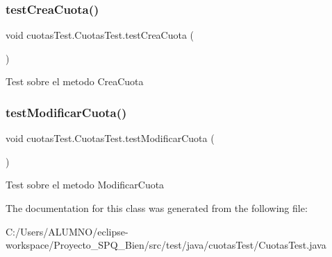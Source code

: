 \subsubsection{\texorpdfstring{test\+Crea\+Cuota()}{testCreaCuota()}}
{\footnotesize\ttfamily void cuotas\+Test.\+Cuotas\+Test.\+test\+Crea\+Cuota (\begin{DoxyParamCaption}{ }\end{DoxyParamCaption})}

Test sobre el metodo Crea\+Cuota \mbox{\label{classcuotas_test_1_1_cuotas_test_a6cd5db403bf04a6b31ddef6b50ed8e2b}} 
\subsubsection{\texorpdfstring{test\+Modificar\+Cuota()}{testModificarCuota()}}
{\footnotesize\ttfamily void cuotas\+Test.\+Cuotas\+Test.\+test\+Modificar\+Cuota (\begin{DoxyParamCaption}{ }\end{DoxyParamCaption})}

Test sobre el metodo Modificar\+Cuota 

The documentation for this class was generated from the following file\+:\begin{DoxyCompactItemize}
\item 
C\+:/\+Users/\+A\+L\+U\+M\+N\+O/eclipse-\/workspace/\+Proyecto\+\_\+\+S\+P\+Q\+\_\+Bien/src/test/java/cuotas\+Test/Cuotas\+Test.\+java\end{DoxyCompactItemize}
